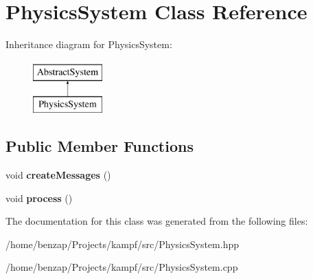 \hypertarget{classPhysicsSystem}{\section{Physics\-System Class Reference}
\label{classPhysicsSystem}
}
Inheritance diagram for Physics\-System\-:\begin{figure}[H]
\begin{center}
\leavevmode
\includegraphics[height=2.000000cm]{classPhysicsSystem}
\end{center}
\end{figure}
\subsection*{Public Member Functions}
\begin{DoxyCompactItemize}
\item 
\hypertarget{classPhysicsSystem_a5dc3878eb21a52575cdae59d250b59cc}{void {\bfseries create\-Messages} ()}\label{classPhysicsSystem_a5dc3878eb21a52575cdae59d250b59cc}

\item 
\hypertarget{classPhysicsSystem_a7aef7930b5f0334f989096eeff285a54}{void {\bfseries process} ()}\label{classPhysicsSystem_a7aef7930b5f0334f989096eeff285a54}

\end{DoxyCompactItemize}


The documentation for this class was generated from the following files\-:\begin{DoxyCompactItemize}
\item 
/home/benzap/\-Projects/kampf/src/Physics\-System.\-hpp\item 
/home/benzap/\-Projects/kampf/src/Physics\-System.\-cpp\end{DoxyCompactItemize}
